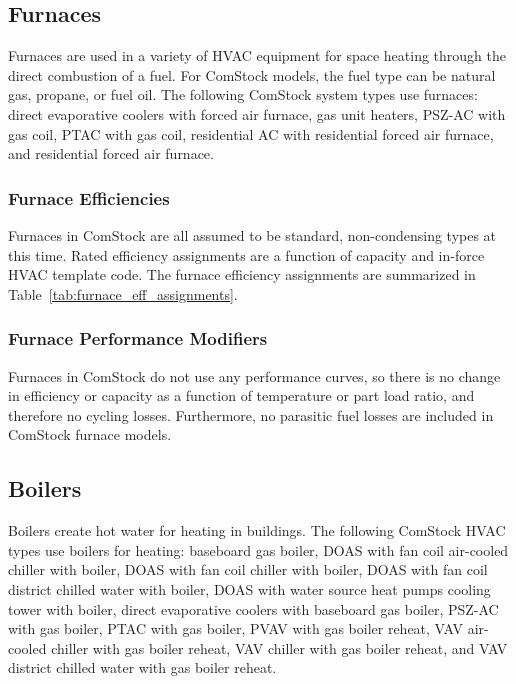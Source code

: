 \subsection{Furnaces}

Furnaces are used in a variety of HVAC equipment for space heating through the direct combustion of a fuel. For ComStock models, the fuel type can be natural gas, propane, or fuel oil. The following ComStock system types use furnaces: direct evaporative coolers with forced air furnace, gas unit heaters, PSZ-AC with gas coil, PTAC with gas coil, residential AC with residential forced air furnace, and residential forced air furnace.

\subsubsection{Furnace Efficiencies}

Furnaces in ComStock are all assumed to be standard, non-condensing types at this time. Rated efficiency assignments are a function of capacity and in-force HVAC template code. The furnace efficiency assignments are summarized in Table~\ref{tab:furnace_eff_assignments}.

\subsubsection{Furnace Performance Modifiers}

Furnaces in ComStock do not use any performance curves, so there is no change in efficiency or capacity as a function of temperature or part load ratio, and therefore no cycling losses. Furthermore, no parasitic fuel losses are included in ComStock furnace models.



\subsection{Boilers}

Boilers create hot water for heating in buildings. The following ComStock HVAC types use boilers for heating: baseboard gas boiler, DOAS with fan coil air-cooled chiller with boiler, DOAS with fan coil chiller with boiler, DOAS with fan coil district chilled water with boiler, DOAS with water source heat pumps cooling tower with boiler, direct evaporative coolers with baseboard gas boiler, PSZ-AC with gas boiler, PTAC with gas boiler, PVAV with gas boiler reheat, VAV air-cooled chiller with gas boiler reheat, VAV chiller with gas boiler reheat, and VAV district chilled water with gas boiler reheat.

